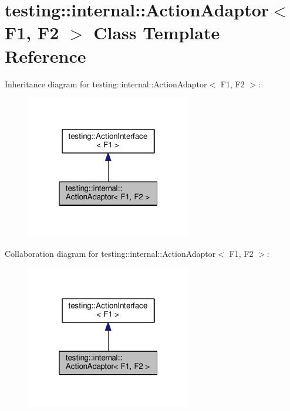 \hypertarget{classtesting_1_1internal_1_1ActionAdaptor}{}\section{testing\+:\+:internal\+:\+:Action\+Adaptor$<$ F1, F2 $>$ Class Template Reference}
\label{classtesting_1_1internal_1_1ActionAdaptor}


Inheritance diagram for testing\+:\+:internal\+:\+:Action\+Adaptor$<$ F1, F2 $>$\+:\nopagebreak
\begin{figure}[H]
\begin{center}
\leavevmode
\includegraphics[width=205pt]{classtesting_1_1internal_1_1ActionAdaptor__inherit__graph}
\end{center}
\end{figure}


Collaboration diagram for testing\+:\+:internal\+:\+:Action\+Adaptor$<$ F1, F2 $>$\+:\nopagebreak
\begin{figure}[H]
\begin{center}
\leavevmode
\includegraphics[width=205pt]{classtesting_1_1internal_1_1ActionAdaptor__coll__graph}
\end{center}
\end{figure}
